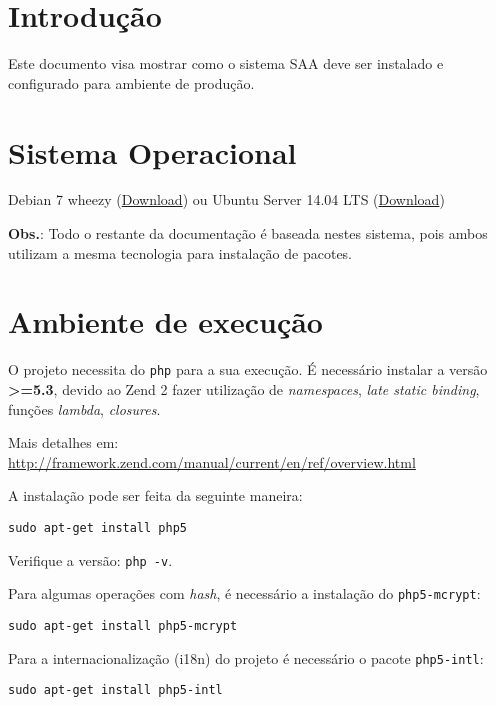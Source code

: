 \section{Introdução}\label{introduuxe7uxe3o}

Este documento visa mostrar como o sistema SAA deve ser instalado e
configurado para ambiente de produção.

\section{Sistema Operacional}\label{sistema-operacional}

Debian 7 wheezy (\href{http://debian.c3sl.ufpr.br/debian-cd/}{Download})
ou Ubuntu Server 14.04 LTS
(\href{http://www.ubuntu.com/download/server}{Download})

\textbf{Obs.}: Todo o restante da documentação é baseada nestes sistema,
pois ambos utilizam a mesma tecnologia para instalação de pacotes.

\section{Ambiente de execução}\label{ambiente-de-execuuxe7uxe3o}

O projeto necessita do \texttt{php} para a sua execução. É necessário
instalar a versão \textbf{\textgreater{}=5.3}, devido ao Zend 2 fazer
utilização de \emph{namespaces}, \emph{late static binding}, funções
\emph{lambda}, \emph{closures}.

Mais detalhes em:
\url{http://framework.zend.com/manual/current/en/ref/overview.html}

A instalação pode ser feita da seguinte maneira:

\begin{verbatim}
sudo apt-get install php5
\end{verbatim}

Verifique a versão: \texttt{php -v}.

Para algumas operações com \emph{hash}, é necessário a instalação do
\texttt{php5-mcrypt}:

\begin{verbatim}
sudo apt-get install php5-mcrypt
\end{verbatim}

Para a internacionalização (i18n) do projeto é necessário o pacote
\texttt{php5-intl}:

\begin{verbatim}
sudo apt-get install php5-intl
\end{verbatim}

